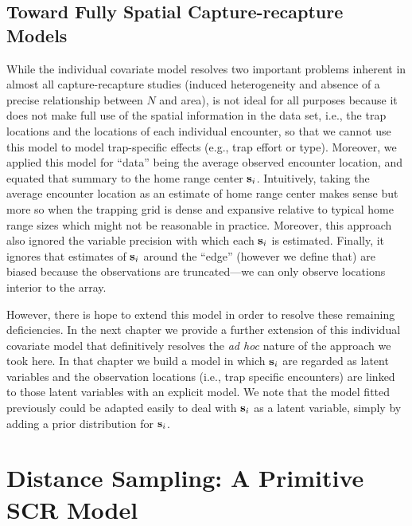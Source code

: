 \subsection{Toward Fully Spatial Capture-recapture Models}

While the individual covariate model resolves two important problems
inherent in almost all capture-recapture studies (induced
heterogeneity and absence of a precise relationship between $N$ and
area), is not ideal for all purposes because it does not make full use
of the spatial information in the data set, i.e., the trap locations
and the locations of each individual encounter, so that we cannot use
this model to model trap-specific effects (e.g., trap effort or type).
Moreover, we applied this model for ``data'' being the average
observed encounter location,
and equated that summary to the home range center ${\bf s}_{i}$. Intuitively, taking
the average encounter location as an estimate of home range center
makes sense but more so when the trapping grid is dense and expansive
relative to typical home range sizes which might not be reasonable in
practice.  
Moreover, this approach also 
ignored the variable precision with which each ${\bf s}_{i}$ is
estimated. Finally, it ignores that  estimates of ${\bf s}_{i}$
around the ``edge'' (however we define that) are biased because the
observations are truncated---we can only observe locations interior to
the array.

However, there is hope to extend this model in order to resolve
these remaining deficiencies.  In the next chapter we provide a further
extension of this individual covariate model that definitively
resolves the {\it ad hoc} nature of the approach we
took here. In that chapter we build a model in which ${\bf s}_{i}$ are
regarded as latent variables and the observation locations (i.e., trap
specific encounters) are linked to those latent variables with an
explicit model. We note that the model fitted previously could be
adapted easily to deal with ${\bf s}_{i}$ as a latent variable, simply
by adding a prior distribution for ${\bf s}_{i}$. 



\section{Distance Sampling: A Primitive SCR Model}

